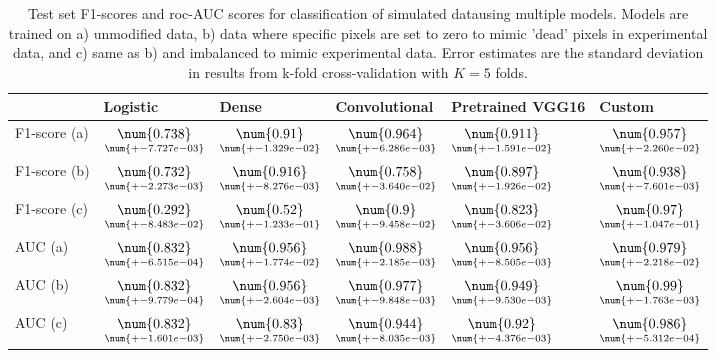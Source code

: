 \begin{table}
\centering
\caption{
Test set F1-scores and roc-AUC scores for classification of simulated datausing multiple models.
Models are trained on a) unmodified data, b) data where specific pixels are set to zero to mimic
'dead' pixels in experimental data, and c) same as b) and imbalanced to mimic experimental data. 
Error estimates are the standard deviation in results from k-fold cross-validation with $K=5$ folds.
}
\label{tab:classification-simulated-all-f1-auc}
\begin{tabular}{llllll}
\toprule
{} &                                            Logistic &                                               Dense &                                       Convolutional &                                    Pretrained VGG16 &                                              Custom \\
\midrule
F1-score (a) &  $\underset{\num{+- 7.727e-03 }  }{\num{ 0.738 } }$ &  $\underset{\num{+- 1.329e-02 }  }{\num{ 0.91 } }$ &  $\underset{\num{+- 6.286e-03 }  }{\num{ 0.964 } }$ &  $\underset{\num{+- 1.591e-02 }  }{\num{ 0.911 } }$ &  $\underset{\num{+- 2.260e-02 }  }{\num{ 0.957 } }$ \\
F1-score (b) &  $\underset{\num{+- 2.273e-03 }  }{\num{ 0.732 } }$ &  $\underset{\num{+- 8.276e-03 }  }{\num{ 0.916 } }$ &  $\underset{\num{+- 3.640e-02 }  }{\num{ 0.758 } }$ &  $\underset{\num{+- 1.926e-02 }  }{\num{ 0.897 } }$ &  $\underset{\num{+- 7.601e-03 }  }{\num{ 0.938 } }$ \\
F1-score (c) &  $\underset{\num{+- 8.483e-02 }  }{\num{ 0.292 } }$ &  $\underset{\num{+- 1.233e-01 }  }{\num{ 0.52 } }$ &  $\underset{\num{+- 9.458e-02 }  }{\num{ 0.9 } }$ &  $\underset{\num{+- 3.606e-02 }  }{\num{ 0.823 } }$ &  $\underset{\num{+- 1.047e-01 }  }{\num{ 0.97 } }$ \\
AUC (a)      &  $\underset{\num{+- 6.515e-04 }  }{\num{ 0.832 } }$ &  $\underset{\num{+- 1.774e-02 }  }{\num{ 0.956 } }$ &  $\underset{\num{+- 2.185e-03 }  }{\num{ 0.988 } }$ &  $\underset{\num{+- 8.505e-03 }  }{\num{ 0.956 } }$ &  $\underset{\num{+- 2.218e-02 }  }{\num{ 0.979 } }$ \\
AUC (b)      &  $\underset{\num{+- 9.779e-04 }  }{\num{ 0.832 } }$ &  $\underset{\num{+- 2.604e-03 }  }{\num{ 0.956 } }$ &  $\underset{\num{+- 9.848e-03 }  }{\num{ 0.977 } }$ &  $\underset{\num{+- 9.530e-03 }  }{\num{ 0.949 } }$ &  $\underset{\num{+- 1.763e-03 }  }{\num{ 0.99 } }$ \\
AUC (c)      &  $\underset{\num{+- 1.601e-03 }  }{\num{ 0.832 } }$ &  $\underset{\num{+- 2.750e-03 }  }{\num{ 0.83 } }$ &  $\underset{\num{+- 8.035e-03 }  }{\num{ 0.944 } }$ &  $\underset{\num{+- 4.376e-03 }  }{\num{ 0.92 } }$ &  $\underset{\num{+- 5.312e-04 }  }{\num{ 0.986 } }$ \\
\bottomrule
\end{tabular}
\end{table}
